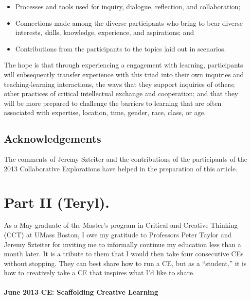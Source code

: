 \begin{itemize}
\itemsep1pt\parskip0pt
\item
  Processes and tools used for inquiry, dialogue, reflection, and
  collaboration;
\item
  Connections made among the diverse participants who bring to bear
  diverse interests, skills, knowledge, experience, and aspirations; and
\item
  Contributions from the participants to the topics laid out in
  scenarios.
\end{itemize}

The hope is that through experiencing a engagement with learning,
participants will subsequently transfer experience with this triad into
their own inquiries and teaching-learning interactions, the ways that
they support inquiries of others; other practices of critical
intellectual exchange and cooperation; and that they will be more
prepared to challenge the barriers to learning that are often associated
with expertise, location, time, gender, race, class, or age.

\subsection{Acknowledgements}\label{acknowledgements}

The comments of Jeremy Szteiter and the contributions of the
participants of the 2013 Collaborative Explorations have helped in the
preparation of this article.

\section*{Part II (Teryl).}\label{part-ii-teryl.}

As a May graduate of the Master's program in Critical and Creative
Thinking (CCT) at UMass Boston, I owe my gratitude to Professors Peter
Taylor and Jeremy Szteiter for inviting me to informally continue my
education less than a month later. It is a tribute to them that I would
then take four consecutive CEs without stopping. They can best share how
to run a CE, but as a ``student,'' it is how to creatively take a CE
that inspires what I'd like to share.

\paragraph{June 2013 CE: Scaffolding Creative
Learning}\label{june-2013-ce-scaffolding-creative-learning}

